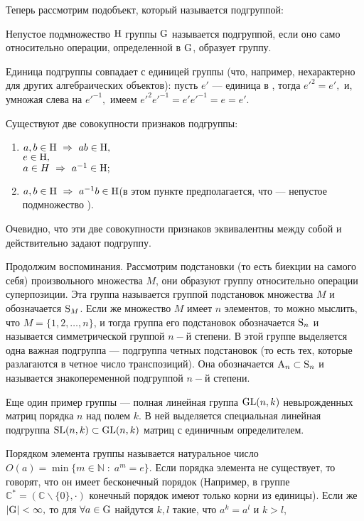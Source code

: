 \par Теперь рассмотрим подобъект, который называется подгруппой: \par\de Непустое подмножество ${\rm H}$ группы ${\rm G}$ называется
подгруппой, если оно само относительно операции, определенной в ${\rm G}$, образует группу.
\par Единица подгруппы совпадает с единицей группы (что, например, нехарактерно для других алгебраических объектов):
пусть $e'$ --- единица в , тогда $e'^2=e',$ и, умножая слева на $e'^{-1},$ имеем $e'^2e'^{-1}=e'e'^{-1}=e=e'.$
\par Существуют две совокупности признаков подгруппы:
\begin{enumerate}
    \item
     $a,b \in {\rm H}\ \Rightarrow\  ab\in {\rm H},$\\
     $e\in {\rm H},$\\
     $a\in H\ \Rightarrow\  a^{-1}\in{\rm H};$
    \item $a,b\in {\rm H}\ \Rightarrow\  a^{-1}b\in {\rm H}$\qquad(в этом пункте предполагается, что  --- непустое подмножество ).
\end{enumerate}
Очевидно, что эти две совокупности признаков эквивалентны между собой и действительно задают подгруппу.
\par Продолжим воспоминания. Рассмотрим подстановки (то есть биекции на самого себя) произвольного множества ${M}$,
они образуют группу относительно операции суперпозиции. Эта группа
называется группой подстановок множества ${M}$ и обозначается
${\rm S}_{{M}}$. Если же множество $M$ имеет $n$ элементов, то
можно мыслить, что $M=\{1,2,\dots,n\}$, и тогда группа его
подстановок обозначается ${\rm S}_n$ и называется симметрической
группой $n-$й степени. В этой группе выделяется одна важная
подгруппа --- подгруппа четных подстановок (то есть тех, которые
разлагаются в четное число транспозиций). Она обозначается
${\rm A}_n\subset {\rm S}_n$ и называется знакопеременной подгруппой
$n-$й степени.
\par Еще один пример группы --- полная линейная группа ${\rm GL}(n,k)$ невырожденных матриц порядка $n$ над полем $k$. В ней выделяется
специальная линейная подгруппа ${\rm SL}(n,k)\subset{\rm GL}(n,k)$ матриц с единичным определителем.
\par\de Порядком элемента группы называется натуральное число $O(a)=\min\{m\in\mathbb{N}\;:\;a^m=e\}.$
Если порядка элемента не существует, то говорят, что он имеет бесконечный порядок (Например, в группе $\mathbb{C}^*=(\mathbb{C}\backslash\{0\},\cdot)$
конечный порядок имеют только корни из единицы). Если же $|{\rm G}|<\infty,$ то для $\forall a\in {\rm G}$ найдутся $k,l$ такие, что $a^k=a^l$ и $k>l$,

